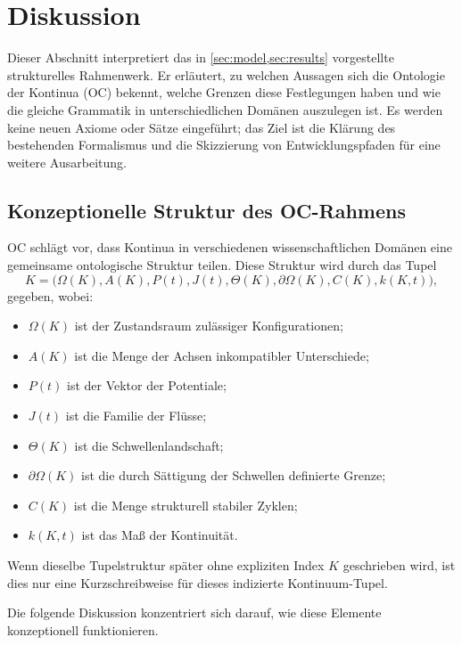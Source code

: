 
\section{Diskussion}
\label{sec:discussion}

Dieser Abschnitt interpretiert das in \cref{sec:model,sec:results} vorgestellte
strukturelles Rahmenwerk. Er erläutert, zu welchen Aussagen sich die Ontologie
der Kontinua (OC) bekennt, welche Grenzen diese Festlegungen haben und wie die
gleiche Grammatik in unterschiedlichen Domänen auszulegen ist.
Es werden keine neuen Axiome oder Sätze eingeführt; das Ziel ist die
Klärung des bestehenden Formalismus und die Skizzierung von Entwicklungspfaden
für eine weitere Ausarbeitung.

\subsection{Konzeptionelle Struktur des OC-Rahmens}

OC schlägt vor, dass Kontinua in verschiedenen wissenschaftlichen Domänen eine
gemeinsame ontologische Struktur teilen.
Diese Struktur wird durch das Tupel
\[
  K = \big(\Omega(K), A(K), P(t), J(t), \Theta(K), \partial\Omega(K), C(K), k(K,t)\big),
\]
gegeben, wobei:
\begin{itemize}
    \item \(\Omega(K)\) ist der Zustandsraum zulässiger Konfigurationen;
    \item \(A(K)\) ist die Menge der Achsen inkompatibler Unterschiede;
    \item \(P(t)\) ist der Vektor der Potentiale;
    \item \(J(t)\) ist die Familie der Flüsse;
    \item \(\Theta(K)\) ist die Schwellenlandschaft;
    \item \(\partial\Omega(K)\) ist die durch Sättigung der Schwellen definierte
          Grenze;
    \item \(C(K)\) ist die Menge strukturell stabiler Zyklen;
    \item \(k(K,t)\) ist das Maß der Kontinuität.
\end{itemize}
Wenn dieselbe Tupelstruktur später ohne expliziten Index \(K\) geschrieben
wird, ist dies nur eine Kurzschreibweise für dieses indizierte
Kontinuum-Tupel.

Die folgende Diskussion konzentriert sich darauf, wie diese Elemente
konzeptionell funktionieren.

